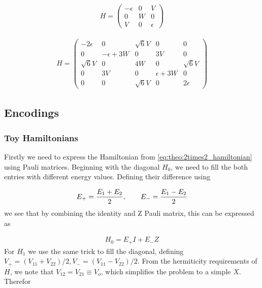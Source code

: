 \begin{align}
    H = \begin{pmatrix}
        -\epsilon & 0 & V \\
        0 & W & 0 \\
        V & 0 & \epsilon
    \end{pmatrix}
\end{align}

\begin{align}
    H = \begin{pmatrix}
        -2\epsilon & 0  & \sqrt{6}V &0 &0 \\
        0 & -\epsilon + 3W & 0 & 3V & 0 \\
        \sqrt{6}V & 0 & 4W & 0 & \sqrt{6}V \\
        0 & 3V & 0 & \epsilon + 3W & 0 \\
        0 & 0 & \sqrt{6}V & 0 & 2\epsilon
    \end{pmatrix}
\end{align}

\subsection{Encodings}
\subsubsection{Toy Hamiltonians}
Firstly we need to express the Hamiltonian from \cref{eq:theo:2times2_hamiltonian} using Pauli matrices. Beginning with the diagonal $H_0$, we need to fill the both entries with different energy values. Defining their difference using

\begin{align*}
    E_+ = \frac{E_1 + E_2}{2},\hspace{20px} E_- = \frac{E_1 - E_2}{2}
\end{align*}
we see that by combining the identity and Z Pauli matrix, this can be expressed as

\begin{align*}
    H_0 = E_+ I + E_- Z
\end{align*}
For $H_1$ we use the same trick to fill the diagonal, defining $V_+ = (V_{11} + V_{22})/2, V_- = (V_{11} - V_{22})/2$. From the hermiticity requirements of $H$, we note that $V_{12} = V_{21} \equiv V_o$, which simplifies the problem to a simple $X$. Therefor

